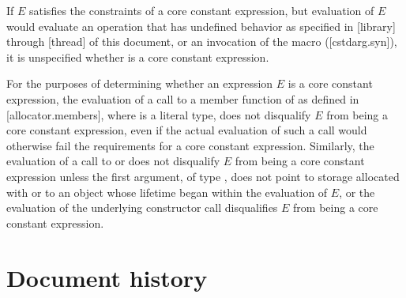 \begin{adjustwidth}{0.5cm}{0.5cm}
If $E$ satisfies the constraints of a core constant expression, but evaluation of $E$ would evaluate an operation that has undefined behavior as specified in [library] through [thread] of this document, or an invocation of the  macro ([cstdarg.syn]), it is unspecified whether  is a core constant expression.

For the purposes of determining
whether an expression $E$ is a core constant expression,
the evaluation of a call to a member function of 
as defined in [allocator.members], where  is a literal type,
does not disqualify $E$ from being a core constant expression,
even if the actual evaluation of such a call
would otherwise fail the requirements for a core constant expression.
Similarly, the evaluation of a call to
 or 
does not disqualify $E$
from being a core constant expression unless
the first argument, of type , does not point
to storage allocated with  or
to an object whose lifetime began within the evaluation of $E$, or
the evaluation of the underlying constructor call
disqualifies $E$ from being a core constant expression.
\end{adjustwidth}

\section*{Document history}

